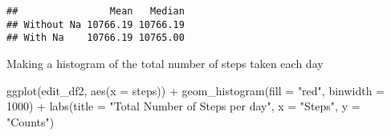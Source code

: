 \documentclass[
]{article}
\newenvironment{Shaded}{\begin{snugshade}}{\end{snugshade}}
\newcommand{\AttributeTok}[1]{\textcolor[rgb]{0.77,0.63,0.00}{#1}}
\newcommand{\CommentTok}[1]{\textcolor[rgb]{0.56,0.35,0.01}{\textit{#1}}}
\newcommand{\ConstantTok}[1]{\textcolor[rgb]{0.00,0.00,0.00}{#1}}
\newcommand{\DecValTok}[1]{\textcolor[rgb]{0.00,0.00,0.81}{#1}}
\newcommand{\FunctionTok}[1]{\textcolor[rgb]{0.00,0.00,0.00}{#1}}
\newcommand{\NormalTok}[1]{#1}
\newcommand{\OtherTok}[1]{\textcolor[rgb]{0.56,0.35,0.01}{#1}}
\newcommand{\SpecialCharTok}[1]{\textcolor[rgb]{0.00,0.00,0.00}{#1}}
\newcommand{\StringTok}[1]{\textcolor[rgb]{0.31,0.60,0.02}{#1}}
\begin{document}
\begin{Shaded}
\end{Shaded}

\begin{verbatim}
##                Mean   Median
## Without Na 10766.19 10766.19
## With Na    10766.19 10765.00
\end{verbatim}

Making a histogram of the total number of steps taken each day

\begin{Shaded}
\begin{Highlighting}[]
\FunctionTok{ggplot}\NormalTok{(edit\_df2, }\FunctionTok{aes}\NormalTok{(}\AttributeTok{x =}\NormalTok{ steps)) }\SpecialCharTok{+} \FunctionTok{geom\_histogram}\NormalTok{(}\AttributeTok{fill =} \StringTok{"red"}\NormalTok{, }\AttributeTok{binwidth =} \DecValTok{1000}\NormalTok{) }\SpecialCharTok{+} \FunctionTok{labs}\NormalTok{(}\AttributeTok{title =} \StringTok{"Total Number of Steps per day"}\NormalTok{, }\AttributeTok{x =} \StringTok{"Steps"}\NormalTok{, }\AttributeTok{y =} \StringTok{"Counts"}\NormalTok{)}
\end{Highlighting}
\end{Shaded}
\end{document}
